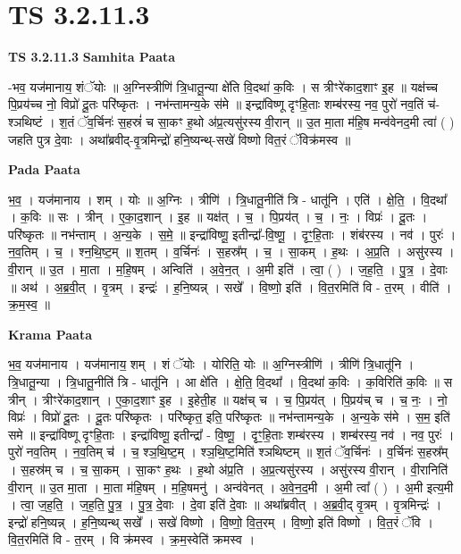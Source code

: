 \documentclass[17pt]{extarticle}
\begin{document}

\section{ TS 3.2.11.3 }

\textbf{TS 3.2.11.3 } \newline
\textbf{Samhita Paata} \newline

-भव॒ यज॑मानाय॒ शंॅयोः ॥ अ॒ग्निस्त्रीणि॑ त्रि॒धातू॒न्या क्षे॑ति वि॒दथा॑ क॒विः । स त्रीꣳरे॑काद॒शाꣳ इ॒ह ॥ यक्ष॑च्च पि॒प्रय॑च्च नो॒ विप्रो॑ दू॒तः परि॑ष्कृतः । नभ॑न्तामन्य॒के स॑मे ॥ इन्द्रा॑विष्णू दृꣳहि॒ताः शम्ब॑रस्य॒ नव॒ पुरो॑ नव॒तिं च॑- श्ञथिष्टं । श॒तं ॅव॒र्चिनः॑ स॒हस्रं॑ च सा॒कꣳ ह॒थो अ॑प्र॒त्यसु॑रस्य वी॒रान् ॥ उ॒त मा॒ता म॑हि॒ष मन्व॑वेनद॒मी त्वा॑ ( ) जहति पुत्र दे॒वाः । अथा᳚ब्रवीद्-वृ॒त्रमिन्द्रो॑ हनि॒ष्यन्थ्-सखे॑ विष्णो वित॒रं ॅविक्र॑मस्व ॥ \newline

\textbf{Pada Paata} \newline

भ॒व॒ । यज॑मानाय । शम् । योः ॥ अ॒ग्निः । त्रीणि॑ । त्रि॒धातू॒नीति॑ त्रि - धातू॑नि । एति॑ । क्षे॒ति॒ । वि॒दथा᳚ । क॒विः ॥ सः । त्रीन् । ए॒का॒द॒शान् । इ॒ह ॥ यक्ष॑त् । च॒ । पि॒प्रय॑त् । च॒ । नः॒ । विप्रः॑ । दू॒तः । परि॑ष्कृतः ॥ नभ॑न्ताम् । अ॒न्य॒के । स॒मे॒ ॥ इन्द्रा॑विष्णू॒ इतीन्द्रा᳚-वि॒ष्णू॒ । दृꣳ॒॒हि॒ताः । शंब॑रस्य । नव॑ । पुरः॑ । न॒व॒तिम् । च॒ । श्न॒थि॒ष्ट॒म् ॥ श॒तम् । व॒र्चिनः॑ । स॒हस्र᳚म् । च॒ । सा॒कम् । ह॒थः । अ॒प्र॒ति । असु॑रस्य । वी॒रान् ॥ उ॒त । मा॒ता । म॒हि॒षम् । अन्विति॑ । अ॒वे॒न॒त् । अ॒मी इति॑ । त्वा॒ ( ) । ज॒ह॒ति॒ । पु॒त्र॒ । दे॒वाः ॥ अथ॑ । अ॒ब्र॒वी॒त् । वृ॒त्रम् । इन्द्रः॑ । ह॒नि॒ष्यन्न् । सखे᳚ । वि॒ष्णो॒ इति॑ । वि॒त॒रमिति॑ वि - त॒रम् । वीति॑ । क्र॒म॒स्व॒ ॥  \newline


\textbf{Krama Paata} \newline

भ॒व॒ यज॑मानाय । यज॑मानाय॒ शम् । शं ॅयोः । योरिति॒ योः ॥ अ॒ग्निस्त्रीणि॑ । त्रीणि॑ त्रि॒धातू॑नि । त्रि॒धातू॒न्या । त्रि॒धातू॒नीति॑ त्रि - धातू॑नि । आ क्षे॑ति । क्षे॒ति॒ वि॒दथा᳚ । वि॒दथा॑ क॒विः । क॒विरिति॑ क॒विः ॥ स त्रीन् । त्रीꣳरे॑काद॒शान् । ए॒का॒द॒शाꣳ इ॒ह । इ॒हेती॒ह ॥ यक्ष॑च् च । च॒ पि॒प्रय॑त् । पि॒प्रय॑च् च । च॒ नः॒ । नो॒ विप्रः॑ । विप्रो॑ दू॒तः । दू॒तः परि॑ष्कृतः । परि॑ष्कृत॒ इति॒ परि॑ष्कृतः ॥ नभ॑न्तामन्य॒के । अ॒न्य॒के स॑मे । स॒म॒ इति॑ समे ॥ इन्द्रा॑विष्णू दृꣳहि॒ताः । इन्द्रा॑विष्णू॒ इतीन्द्रा᳚ - वि॒ष्णू॒ । दृꣳ॒॒हि॒ताः शम्ब॑रस्य । शम्ब॑रस्य॒ नव॑ । नव॒ पुरः॑ । पुरो॑ नव॒तिम् । न॒व॒तिम् च॑ । च॒ श्ञ॒थि॒ष्ट॒म् । श्ञ॒थि॒ष्ट॒मिति॑ श्ञथिष्टम् ॥ श॒तं ॅव॒र्चिनः॑ । व॒र्चिनः॑ स॒हस्र᳚म् । स॒हस्र॑म् च । च॒ सा॒कम् । सा॒कꣳ ह॒थः । ह॒थो अ॑प्र॒ति । अ॒प्र॒त्यसु॑रस्य । असु॑रस्य वी॒रान् । वी॒रानिति॑ वी॒रान् ॥ उ॒त मा॒ता । मा॒ता म॑हि॒षम् । म॒हि॒षमनु॑ । अन्व॑वेनत् । अ॒वे॒न॒द॒मी । अ॒मी त्वा᳚ ( ) । अ॒मी इत्य॒मी । त्वा॒ ज॒ह॒ति॒ । ज॒ह॒ति॒ पु॒त्र॒ । पु॒त्र॒ दे॒वाः । दे॒वा इति॑ दे॒वाः ॥ अथा᳚ब्रवीत् । अ॒ब्र॒वी॒द् वृ॒त्रम् । वृ॒त्रमिन्द्रः॑ । इन्द्रो॑ हनि॒ष्यन्न् । ह॒नि॒ष्यन्थ् सखे᳚ । सखे॑ विष्णो । वि॒ष्णो॒ वि॒त॒रम् । वि॒ष्णो॒ इति॑ विष्णो । वि॒त॒रं ॅवि । वि॒त॒रमिति॑ वि - त॒रम् । वि क्र॑मस्व । क्र॒म॒स्वेति॑ क्रमस्व । \newline
\end{document}
